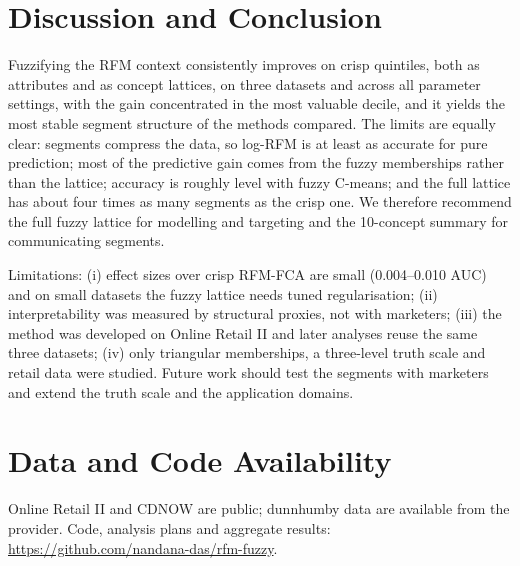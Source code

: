 \documentclass[conference]{IEEEtran}
\begin{document}
\section{Discussion and Conclusion}

Fuzzifying the RFM context consistently improves on crisp quintiles, both as attributes and as concept lattices, on three datasets and across all parameter settings, with the gain concentrated in the most valuable decile, and it yields the most stable segment structure of the methods compared. The limits are equally clear: segments compress the data, so log-RFM is at least as accurate for pure prediction; most of the predictive gain comes from the fuzzy memberships rather than the lattice; accuracy is roughly level with fuzzy C-means; and the full lattice has about four times as many segments as the crisp one. We therefore recommend the full fuzzy lattice for modelling and targeting and the 10-concept summary for communicating segments.

Limitations: (i) effect sizes over crisp RFM-FCA are small (0.004--0.010 AUC) and on small datasets the fuzzy lattice needs tuned regularisation; (ii) interpretability was measured by structural proxies, not with marketers; (iii) the method was developed on Online Retail II and later analyses reuse the same three datasets; (iv) only triangular memberships, a three-level truth scale and retail data were studied. Future work should test the segments with marketers and extend the truth scale and the application domains.

\section*{Data and Code Availability}
Online Retail II and CDNOW are public; dunnhumby data are available from the provider. Code, analysis plans and aggregate results: \url{https://github.com/nandana-das/rfm-fuzzy}.



\end{document}
